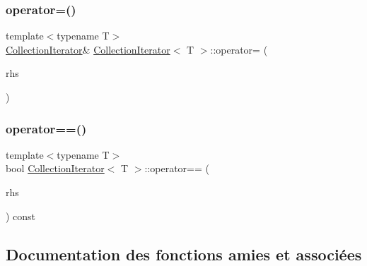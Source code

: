 \mbox{\label{class_collection_iterator_a0833a1abf480292154ba6e9f838b431b}} 
\subsubsection{\texorpdfstring{operator=()}{operator=()}\hspace{0.1cm}{\footnotesize\ttfamily [2/2]}}
{\footnotesize\ttfamily template$<$typename T$>$ \\
\hyperlink{class_collection_iterator}{Collection\+Iterator}\& \hyperlink{class_collection_iterator}{Collection\+Iterator}$<$ T $>$\+::operator= (\begin{DoxyParamCaption}\item[{\hyperlink{class_collection_iterator}{Collection\+Iterator}$<$ T $>$ \&\&}]{rhs }\end{DoxyParamCaption})\hspace{0.3cm}{\ttfamily [inline]}}

\mbox{\label{class_collection_iterator_ab0bd97b5ce32b24ea6559370805cf8ee}} 
\subsubsection{\texorpdfstring{operator==()}{operator==()}}
{\footnotesize\ttfamily template$<$typename T$>$ \\
bool \hyperlink{class_collection_iterator}{Collection\+Iterator}$<$ T $>$\+::operator== (\begin{DoxyParamCaption}\item[{const \hyperlink{class_collection_iterator}{Collection\+Iterator}$<$ T $>$ \&}]{rhs }\end{DoxyParamCaption}) const\hspace{0.3cm}{\ttfamily [inline]}}



\subsection{Documentation des fonctions amies et associées}
\mbox{\label{class_collection_iterator_a6076dfcb85a3a7cb903b827fa821fe54}} 
